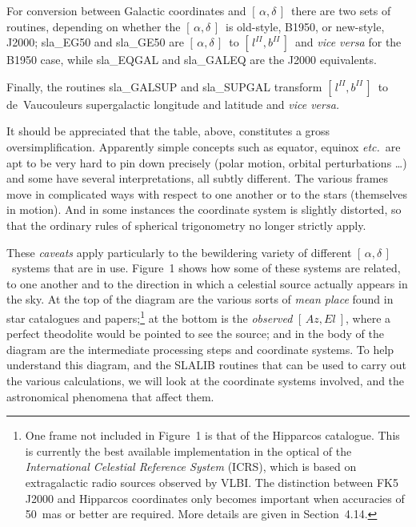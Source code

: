 \documentclass[11pt,twoside,nolof]{starlink}
\providecommand{\radec}     {$[\,\alpha,\delta\,]$}
\providecommand{\azel}      {$[\,Az,El~]$}
\providecommand{\gal}       {$[\,l^{I\!I},b^{I\!I}\,]$}
\begin{document}
For conversion between Galactic coordinates and \radec\ there are
two sets of routines, depending on whether the \radec\ is
old-style, B1950, or new-style, J2000;
sla\_EG50
and
sla\_GE50
are \radec\ to \gal\ and \textit{vice versa}\/ for the B1950 case, while
sla\_EQGAL
and
sla\_GALEQ
are the J2000 equivalents.

Finally, the routines
sla\_GALSUP
and
sla\_SUPGAL
transform \gal\ to de~Vaucouleurs supergalactic longitude and latitude
and \textit{vice versa.}

It should be appreciated that the table, above, constitutes
a gross oversimplification.   Apparently
simple concepts such as equator, equinox \textit{etc.}\ are apt to be very hard to
pin down precisely (polar motion, orbital perturbations \ldots) and
some have several interpretations, all subtly different.  The various
frames move in complicated ways with respect to one another or to
the stars (themselves in motion).  And in some instances the
coordinate system is slightly distorted, so that the
ordinary rules of spherical trigonometry no longer strictly apply.

These \textit{caveats}\/
apply particularly to the bewildering variety of different
\radec\ systems that are in use.  Figure~1 shows how
some of these systems are related, to one another and
to the direction in which a celestial source actually
appears in the sky.  At the top of the diagram are
the various sorts of \textit{mean place}\/
found in star catalogues and papers;\footnote{One frame not included in
Figure~1 is that of the Hipparcos catalogue.  This is currently the
best available implementation in the optical of the \textit{International
Celestial Reference System}\/ (ICRS), which is based on extragalactic
radio sources observed by VLBI.  The distinction between FK5 J2000
and Hipparcos coordinates only becomes important when accuracies of
50~mas or better are required.  More details are given in
Section~4.14.} at the bottom is the
\textit{observed}\/ \azel, where a perfect theodolite would
be pointed to see the source;  and in the body of
the diagram are
the intermediate processing steps and coordinate
systems.  To help
understand this diagram, and the SLALIB routines that can
be used to carry out the various calculations, we will look at the coordinate
systems involved, and the astronomical phenomena that
affect them.
\end{document}
